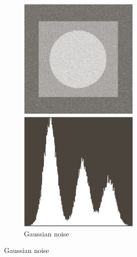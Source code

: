 \begin{figure}[H]
    \centering
    \begin{subfigure}[b]{0.22\textwidth}
        \includegraphics[width=\textwidth]{img3/noise_g.png}
        \caption{Gaussian noise}

\end{subfigure}
\end{figure}
